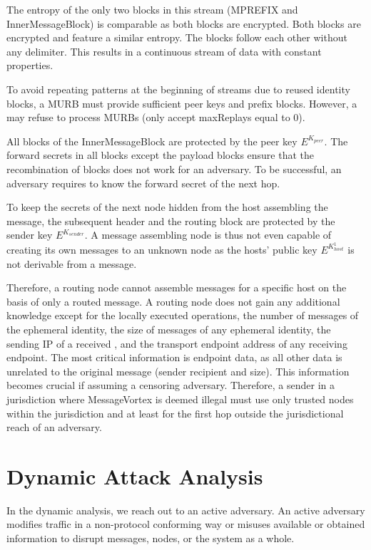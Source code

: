 The entropy of the only two blocks in this stream (MPREFIX and InnerMessageBlock) is comparable as both blocks are encrypted. Both blocks are encrypted and feature a similar entropy. The blocks follow each other without any delimiter. This results in a continuous stream of data with constant properties. 

To avoid repeating patterns at the beginning of streams due to reused identity blocks, a MURB must provide sufficient peer keys and prefix blocks. However, a \VortexNode{} may refuse to process MURBs (only accept maxReplays equal to 0).

All blocks of the InnerMessageBlock are protected by the peer key $E^{K_{peer}}$. The forward secrets in all blocks except the payload blocks ensure that the recombination of blocks does not work for an adversary. To be successful, an adversary requires to know the forward secret of the next hop.

To keep the secrets of the next node hidden from the host assembling the message, the subsequent header and the routing block are protected by the sender key $E^{K_{sender}}$. A message assembling node is thus not even capable of creating its own messages to an unknown node as the hosts' public key $E^{K^{1}_{host}}$ is not derivable from a message.

Therefore, a routing node cannot assemble messages for a specific host on the basis of only a routed message. A routing node does not gain any additional knowledge except for the locally executed operations, the number of messages of the ephemeral identity, the size of messages of any ephemeral identity, the sending IP of a received \VortexMessage, and the transport endpoint address of any receiving endpoint. The most critical information is endpoint data, as all other data is unrelated to the original message (sender recipient and size). This information becomes crucial if assuming a censoring adversary. Therefore, a sender in a jurisdiction where MessageVortex{} is deemed illegal must use only trusted nodes within the jurisdiction and at least for the first hop outside the jurisdictional reach of an adversary.


\chapter{Dynamic Attack Analysis}\label{sec:dynamicAnalysis}
In the dynamic analysis, we reach out to an active adversary. An active adversary modifies traffic in a non-protocol conforming way or misuses available or obtained information to disrupt messages, nodes, or the system as a whole.

